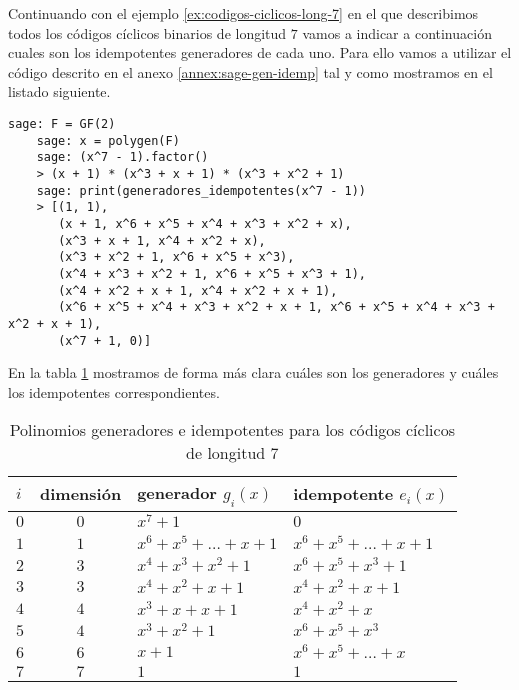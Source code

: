 \begin{example}
  Continuando con el ejemplo \ref{ex:codigos-ciclicos-long-7} en el que describimos todos los códigos cíclicos binarios de longitud \(7\) vamos a indicar a continuación cuales son los idempotentes generadores de cada uno.
  Para ello vamos a utilizar el código descrito en el anexo \ref{annex:sage-gen-idemp} tal y como mostramos en el listado siguiente.
  \begin{lstlisting}[gobble=4]
    sage: F = GF(2)
    sage: x = polygen(F)
    sage: (x^7 - 1).factor()
    > (x + 1) * (x^3 + x + 1) * (x^3 + x^2 + 1)
    sage: print(generadores_idempotentes(x^7 - 1))
    > [(1, 1),
       (x + 1, x^6 + x^5 + x^4 + x^3 + x^2 + x),
       (x^3 + x + 1, x^4 + x^2 + x),
       (x^3 + x^2 + 1, x^6 + x^5 + x^3),
       (x^4 + x^3 + x^2 + 1, x^6 + x^5 + x^3 + 1),
       (x^4 + x^2 + x + 1, x^4 + x^2 + x + 1),
       (x^6 + x^5 + x^4 + x^3 + x^2 + x + 1, x^6 + x^5 + x^4 + x^3 + x^2 + x + 1),
       (x^7 + 1, 0)]
  \end{lstlisting}
  En la tabla \ref{tab:gen-idempotentes-7} mostramos de forma más clara cuáles son los generadores y cuáles los idempotentes correspondientes.
  \begin{table}[h]
    \centering
    \sffamily
    \begin{tabular}{lcll}
      \toprule
      \(i\) & dimensión & generador \(g_i(x)\) & idempotente \(e_i(x)\)\\
      \midrule
      \(0\) & \(0\) & \(x^7 + 1\) & \(0\)\\
      \(1\) & \(1\) & \(x^6 + x^5 + \dots + x + 1\) & \(x^6 + x^5 + \dots + x + 1\)\\
      \(2\) & \(3\) & \(x^4 + x^3 + x^2 + 1\) & \(x^6 + x^5 + x^3 + 1\)\\
      \(3\) & \(3\) & \(x^4 + x^2 + x +1 \) & \(x^4 + x^2 + x +1 \)\\
      \(4\) & \(4\) & \(x^3 + x + x +1 \) & \(x^4 + x^2 + x\)\\
      \(5\) & \(4\) & \(x^3 + x^2 +1 \) & \(x^6 + x^5 + x^3\)\\
      \(6\) & \(6\) & \(x + 1\) & \(x^6 + x^5 + \dots + x\)\\
      \(7\) & \(7\) & \(1\) & \(1\)\\
      \bottomrule
    \end{tabular}
    \caption{Polinomios generadores e idempotentes para los códigos cíclicos de longitud 7}
    \label{tab:gen-idempotentes-7}
  \end{table}
\end{example}

